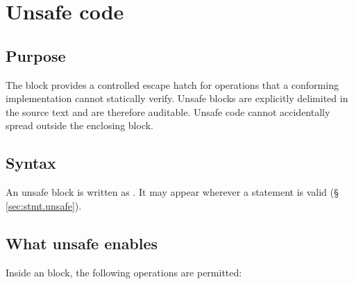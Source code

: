\chapter{Unsafe code}
\label{sec:18-unsafe}

\section{Purpose}
\label{sec:unsafe.purpose}

\pnum
The  block provides a controlled escape hatch for operations
that a conforming implementation cannot statically verify.  Unsafe blocks
are explicitly delimited in the source text and are therefore auditable.
Unsafe code cannot accidentally spread outside the enclosing block.

\section{Syntax}
\label{sec:unsafe.syntax}

\pnum
An unsafe block is written as .  It may appear
wherever a statement is valid (\S\,\ref{sec:stmt.unsafe}).

\section{What unsafe enables}
\label{sec:unsafe.enables}

\pnum
Inside an  block, the following operations are permitted:

